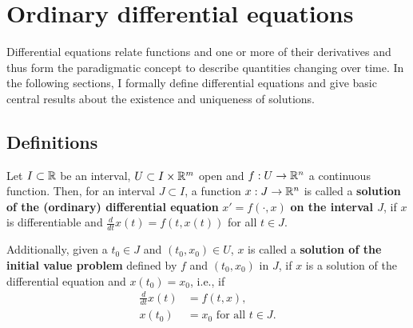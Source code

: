 \section{Ordinary differential equations}\label{sec:ODEs}

Differential equations relate functions and one or more of their derivatives and thus form the paradigmatic concept to describe quantities changing over time. In the following sections, I  formally define differential equations and give basic central results about the existence and uniqueness of solutions. 

\subsection{Definitions}

\begin{definition}\label{def:ODE}
	Let $I\subset \mathbb{R}$ be an interval, $U\subset I\times \mathbb{R}^m$ open and $f:U\to\mathbb{R}^n$ a continuous function. Then, for an interval $J\subset I$, a function $x:J\to \mathbb{R}^n$ is called a \textbf{solution of the (ordinary) differential equation} $x' = f(\cdot, x)$ \textbf{on the interval $J$}, if $x$ is differentiable and
	$\frac{d}{dt} x(t) = f(t,x(t))$ for all $t\in J.$

	Additionally, given a $t_0\in J$ and $(t_0,x_0)\in U$, $x$ is called a \textbf{solution of the initial value problem} defined by $f$ and $(t_0,x_0)$ in $J$, if $x$ is a solution of the differential equation and $x(t_0) = x_0$, i.e., if
	\begin{equation*}
	\begin{split}
		\frac{d}{dt} x(t) &= f(t,x), \\
		x(t_0) &= x_0 \text{~for all~} t\in J.
	\end{split}
	\end{equation*} 
	\end{definition}

